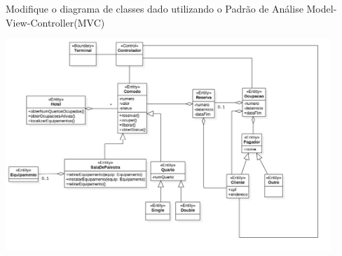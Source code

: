 \documentclass[12pt]{exam}
\begin{document}
    \begin{questions}
	\question Modifique o diagrama de classes dado utilizando o Padrão de Análise Model-View-Controller(MVC)
	\begin{solution}
	   \includegraphics[width=0.92\textwidth]{imagens/exercicios-hotel-regina-2-solucao-e1.jpg}
	\end{solution}
	

\end{questions}
\end{document}
